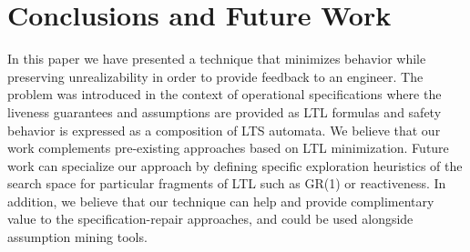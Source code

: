 \section{Conclusions and Future Work}\label{sec:conclusion}
In this paper we have presented a technique that minimizes behavior while
preserving unrealizability in order to provide feedback to an engineer.
The problem was introduced in the context of operational specifications where
the liveness guarantees and assumptions are provided as LTL formulas and safety behavior
is expressed as a composition of LTS automata.  %
We believe that our work complements pre-existing approaches based on LTL minimization. 
Future work can specialize
our approach by defining specific exploration heuristics of the search space for particular fragments of LTL such as GR(1) or reactiveness.  
In addition, we believe that our technique can help and provide complimentary value to the
specification-repair approaches, and could be used alongside assumption mining
tools.

